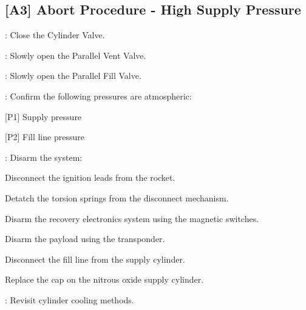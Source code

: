 \subsection{[A3] Abort Procedure - High Supply Pressure}
\begin{checklist}
    \item \primary{}: Close the Cylinder Valve.
    \item \primary{}: Slowly open the Parallel Vent Valve.
    \item \primary{}: Slowly open the Parallel Fill Valve.
    \item \control{}: Confirm the following pressures are atmospheric:
    \begin{checklist}
        \item {[P1]} Supply pressure
        \item {[P2]} Fill line pressure
    \end{checklist}
    \item \primary{}: Disarm the system:
        \begin{checklist}    
            \item Disconnect the ignition leads from the rocket.
            \item Detatch the torsion springs from the disconnect mechanism.
            \item Disarm the recovery electronics system using the magnetic switches.
            \item Disarm the payload using the transponder.
            \item Disconnect the fill line from the supply cylinder.
            \item Replace the cap on the nitrous oxide supply cylinder.
        \end{checklist}
    \item \ops{}: Revisit cylinder cooling methods.
\end{checklist}
\setcounter{checklistnum}{0}

